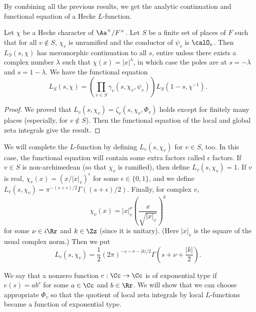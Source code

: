 By combining all the previous results, we get the analytic continuation and functional equation of a Hecke $L$-function. 
\begin{theorem}
Let  $\chi$ be a Hecke character of $\Aa^{\times}/F^{\times}$. Let $S$ be a finite set of places of $F$ such that for all $v\not\in S$, $\chi_{v}$ is unramified and the conductor of $\psi_{v}$ is $\calO_{v}$. 
Then $L_{S}(s, \chi)$ has meromorphic continuation to all $s$, entire unless there exists a complex number $\lambda$ such that $\chi(x) = |x|^{\lambda}$, in which case the poles are at $s =- \lambda$ and $s = 1-\lambda$. We have the functional equation
$$
L_{S}(s, \chi) = \left( \prod_{v\in S} \gamma_{v}(s, \chi_{v}, \psi_{v})\right) L_{S}(1-s, \chi^{-1}). 
$$
\end{theorem}
\begin{proof}
We proved that $L_{v}(s, \chi_{v}) = \zeta_{v}(s, \chi_{v}, \Phi_{v})$ holds except for finitely many places (especially, for $v\not\in S$). Then the functional equation of the local and global zeta integrals give the result.  
\end{proof}

We will complete the $L$-function by defining $L_{v}(s, \chi_{v})$ for $v\in S$, too. 
In this case, the functional equation will contain some extra factors called $\epsilon$ factors. 
If $v\in S$ is non-archimedean (so that $\chi_{v}$ is ramified), then define $L_{v}(s, \chi_{v}) = 1$. 
If $v$ is real, $\chi_{v}(x) = (x/|x|_{v})^{\epsilon}$ for some $\epsilon \in \{0, 1\}$, and we define $L_{v}(s, \chi_{v}) = \pi^{-(s+\epsilon)/2}\Gamma((s+\epsilon)/2)$. 
Finally, for complex $v$, 
$$
\chi_{v}(x) = |x|_{v}^{\nu} \left( \frac{x}{\sqrt{|x|_{v}}}\right)^{k}
$$
for some $\nu\in i\Rr$ and $k\in \Zz$ (since it is unitary). (Here $|x|_{v}$ is the square of the usual complex norm.) Then we put
$$
L_{v}(s, \chi_{v}) = \frac{1}{2}(2\pi)^{-s-\nu-|k|/2} \Gamma\left( s + \nu + \frac{|k|}{2}\right).
$$

We say that a nonzero function $e:\Cc\to \Cc$ is of exponential type if $e(s) = ab^{s}$ for some $a\in \Cc$ and $b\in\Rr$. We will show that we can choose appropriate $\Phi_{v}$ so that the quotient of local zeta integrals by local $L$-functions became a function of exponential type. 


